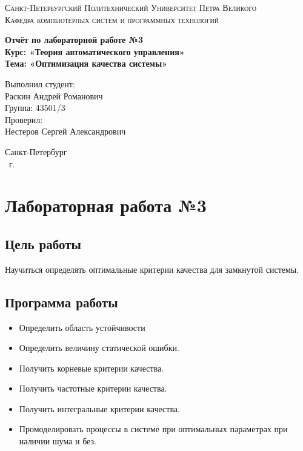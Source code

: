 \documentclass[14pt,a4paper,report]{report}
\begin{document}
	
	\def\contentsname{Содержание}
	
	\begin{titlepage}
		\begin{center}
			\textsc{Санкт-Петербургский Политехнический 
				Университет Петра Великого\\[5mm]
				Кафедра компьютерных систем и программных технологий}
			
			\vfill
			
			\textbf{Отчёт по лабораторной работе №3\\[3mm]
				Курс: «Теория автоматического управления»\\[3mm]
				Тема: «Оптимизация качества системы»\\[35mm]
			}
		\end{center}
		
		\hfill
		\begin{minipage}{.5\textwidth}
			Выполнил студент:\\[2mm] 
			Раскин Андрей Романович\\
			Группа: 43501/3\\[5mm]
			
			Проверил:\\[2mm] 
			Нестеров Сергей Александрович
		\end{minipage}
		\vfill
		\begin{center}
			Санкт-Петербург\\ \the\year\ г.
		\end{center}
	\end{titlepage}
	
	\tableofcontents
	\clearpage
	
	\chapter{Лабораторная работа №3}
	
	\section{Цель работы}
	
	Научиться определять оптимальные критерии качества для замкнутой системы.
	
	\section{Программа работы}
	
	\begin{itemize}
		\item Определить область устойчивости
		\item Определить величину статической ошибки.
		\item Получить корневые критерии качества.
		\item Получить частотные критерии качества.
		\item Получить интегральные критерии качества.
		\item Промоделировать процессы в системе при оптимальных параметрах при наличии шума и без.
	\end{itemize}
	
\end{document}
